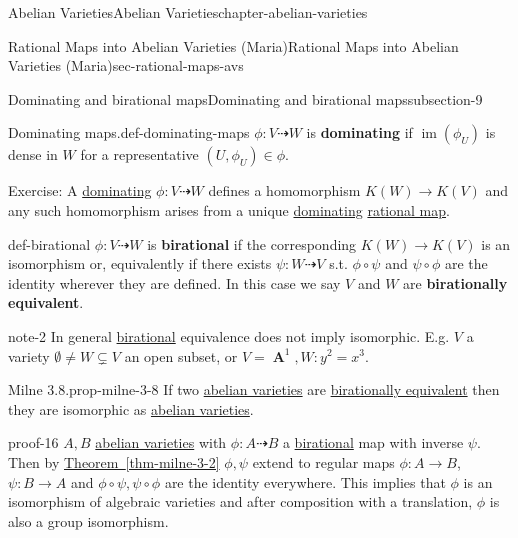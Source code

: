 \documentclass[oneside,10pt,]{book}
\newcommand{\terminology}[1]{\textbf{#1}}
\numberwithin{equation}{section}
\DeclareMathOperator{\im}{im}
\DeclareMathOperator{\aff}{\mathbf{A}}
\begin{document}
\begin{chapterptx}{Abelian Varieties}{}{Abelian Varieties}{}{}{chapter-abelian-varieties}
\begin{sectionptx}{Rational Maps into Abelian Varieties (Maria)}{}{Rational Maps into Abelian Varieties (Maria)}{}{}{sec-rational-maps-avs}
\typeout{************************************************}
%
\begin{subsectionptx}{Dominating and birational maps}{}{Dominating and birational maps}{}{}{subsection-9}
\begin{definition}{Dominating maps.}{def-dominating-maps}%
\hypertarget{p-96}{}%
\(\phi\colon V \dashrightarrow W\) is \terminology{dominating} if \(\im (\phi_U)\) is dense in \(W\) for a representative \((U,\phi_U)\in \phi\).%
\end{definition}
\hypertarget{p-97}{}%
Exercise: A \hyperref[def-dominating-maps]{dominating} \(\phi\colon V\dashrightarrow W\) defines a homomorphism \(K(W) \to K(V)\) and any such homomorphism arises from a unique \hyperref[def-dominating-maps]{dominating} \hyperref[def-rational-map]{rational map}.%
\begin{definition}{}{def-birational}%
\hypertarget{p-98}{}%
\(\phi\colon V \dashrightarrow W\) is \terminology{birational} if the corresponding \(K(W)\to K(V)\) is an isomorphism or, equivalently if there exists \(\psi\colon W\dashrightarrow V \) s.t. \(\phi\circ \psi\) and \(\psi\circ\phi\) are the identity wherever they are defined. In this case we say \(V\) and \(W\) are \terminology{birationally equivalent}.%
\end{definition}
\begin{note}{}{note-2}%
\hypertarget{p-99}{}%
In general \hyperref[def-birational]{birational} equivalence does not imply isomorphic. E.g. \(V\) a variety \(\emptyset \ne W\subsetneq V\) an open subset, or \(V= \aff^1, W \colon y^2 =x^3\).%
\end{note}
\begin{theorem}{Milne 3.8.}{}{prop-milne-3-8}%
\hypertarget{p-100}{}%
If two \hyperref[def-buntes-abvar]{abelian varieties} are \hyperref[def-birational]{birationally equivalent} then they are isomorphic as \hyperref[def-buntes-abvar]{abelian varieties}.%
\end{theorem}
\begin{proofptx}{}{proof-16}
\hypertarget{p-101}{}%
\(A,B\) \hyperref[def-buntes-abvar]{abelian varieties} with \(\phi \colon A\dashrightarrow B\) a \hyperref[def-birational]{birational} map with inverse \(\psi\). Then by \hyperref[thm-milne-3-2]{Theorem~\ref{thm-milne-3-2}} \(\phi ,\psi\) extend to regular maps   \(\phi\colon A \to B \), \(\psi\colon B\to A\) and \(\phi\circ\psi,\psi\circ\phi\) are  the identity everywhere. This implies that \(\phi\) is an isomorphism of  algebraic varieties and after composition with a translation, \(\phi\) is also a group isomorphism.%

\end{proofptx}
\end{subsectionptx}
\end{sectionptx}
\end{chapterptx}
\end{document}
